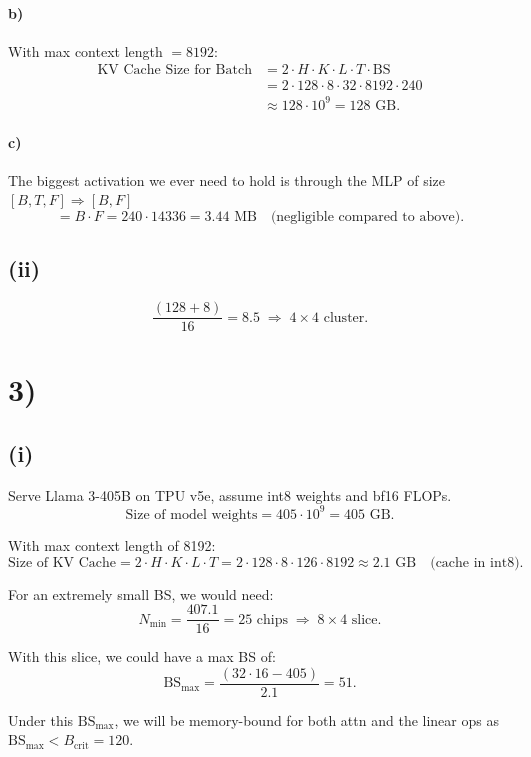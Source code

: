 \documentclass[11pt]{article}
\begin{document}
\paragraph{b)} With max context length $= 8192$:
\begin{align*}
\text{KV Cache Size for Batch} &= 2 \cdot H \cdot K \cdot L \cdot T \cdot \text{BS} \\
&= 2 \cdot 128 \cdot 8 \cdot 32 \cdot 8192 \cdot 240 \\
&\approx 128 \cdot 10^9 = 128 \text{ GB.}
\end{align*}

\paragraph{c)} The biggest activation we ever need to hold is through the MLP of size $[B, T, F] \Rightarrow [B, F]$
\[
= B \cdot F = 240 \cdot 14336 = 3.44 \text{ MB} \quad \text{(negligible compared to above).}
\]

\subsection*{(ii)}

\[
\frac{(128 + 8)}{16} = 8.5 \;\Rightarrow\; 4 \times 4 \text{ cluster.}
\]

\section*{3)}

\subsection*{(i)}

Serve Llama 3-405B on TPU v5e, assume int8 weights and bf16 FLOPs.
\[
\text{Size of model weights} = 405 \cdot 10^9 = 405 \text{ GB.}
\]

With max context length of 8192:
\[
\text{Size of KV Cache} = 2 \cdot H \cdot K \cdot L \cdot T = 2 \cdot 128 \cdot 8 \cdot 126 \cdot 8192 \approx 2.1 \text{ GB} \quad \text{(cache in int8).}
\]

For an extremely small BS, we would need:
\[
N_{\min} = \frac{407.1}{16} = 25 \text{ chips} \;\Rightarrow\; 8 \times 4 \text{ slice.}
\]

With this slice, we could have a max BS of:
\[
\text{BS}_{\max} = \frac{(32 \cdot 16 - 405)}{2.1} = 51.
\]

Under this $\text{BS}_{\max}$, we will be memory-bound for both attn and the linear ops as $\text{BS}_{\max} < B_{\text{crit}} = 120$.
\end{document}
